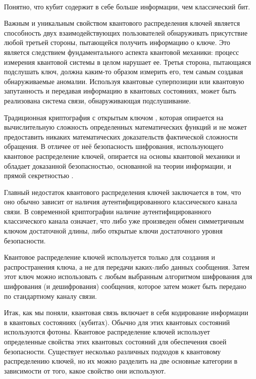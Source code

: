 \documentclass[a4paper,12pt]{article} %
\begin{document}
~\\

Понятно, что кубит содержит в себе больше информации, чем классический бит.

Важным и уникальным свойством квантового распределения ключей является способность двух взаимодействующих пользователей обнаруживать присутствие любой третьей стороны, пытающейся получить информацию о ключе. Это является следствием фундаментального аспекта квантовой механики: процесс измерения квантовой системы в целом нарушает ее. Третья сторона, пытающаяся подслушать ключ, должна каким-то образом измерить его, тем самым создавая обнаруживаемые аномалии. Используя квантовые суперпозиции или квантовую запутанность и передавая информацию в квантовых состояниях, может быть реализована система связи, обнаруживающая подслушивание. 	

Традиционная криптография с открытым ключом , которая опирается на вычислительную сложность определенных математических функций и не может предоставить никаких математических доказательств фактической сложности обращения. В отличее от неё безопасность шифрования, использующего квантовое распределение ключей, опирается на основы квантовой механики и обладает доказанной безопасностью, основанной на теории информации, и прямой секретностью .

Главный недостаток квантового распределения ключей заключается в том, что оно обычно зависит от наличия аутентифицированного классического канала связи. В современной криптографии наличие аутентифицированного классического канала означает, что либо уже произведен обмен симметричным ключом достаточной длины, либо открытые ключи достаточного уровня безопасности. 

Квантовое распределение ключей используется только для создания и распространения ключа, а не для передачи каких-либо данных сообщения. Затем этот ключ можно использовать с любым выбранным алгоритмом шифрования для шифрования (и дешифрования) сообщения, которое затем может быть передано по стандартному каналу связи.

Итак, как мы поняли, квантовая связь включает в себя кодирование информации в квантовых состояниях (кубитах). Обычно для этих квантовых состояний используются фотоны. Квантовое распределение ключей использует определенные свойства этих квантовых состояний для обеспечения своей безопасности. Существует несколько различных подходов к квантовому распределению ключей, но их можно разделить на две основные категории в зависимости от того, какое свойство они используют.
\end{document}
